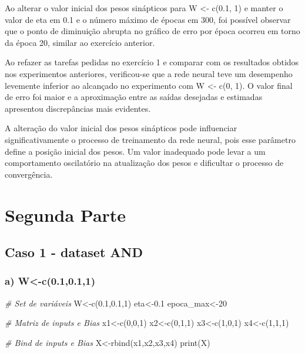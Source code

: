 \documentclass[
]{article}
\newenvironment{Shaded}{\begin{snugshade}}{\end{snugshade}}
\newcommand{\CommentTok}[1]{\textcolor[rgb]{0.56,0.35,0.01}{\textit{#1}}}
\newcommand{\DecValTok}[1]{\textcolor[rgb]{0.00,0.00,0.81}{#1}}
\newcommand{\FloatTok}[1]{\textcolor[rgb]{0.00,0.00,0.81}{#1}}
\newcommand{\FunctionTok}[1]{\textcolor[rgb]{0.00,0.00,0.00}{#1}}
\newcommand{\NormalTok}[1]{#1}
\newcommand{\OtherTok}[1]{\textcolor[rgb]{0.56,0.35,0.01}{#1}}
\begin{document}
Ao alterar o valor inicial dos pesos sinápticos para W \textless- c(0.1,
1) e manter o valor de eta em 0.1 e o número máximo de épocas em 300,
foi possível observar que o ponto de diminuição abrupta no gráfico de
erro por época ocorreu em torno da época 20, similar ao exercício
anterior.

Ao refazer as tarefas pedidas no exercício 1 e comparar com os
resultados obtidos nos experimentos anteriores, verificou-se que a rede
neural teve um desempenho levemente inferior ao alcançado no experimento
com W \textless- c(0, 1). O valor final de erro foi maior e a
aproximação entre as saídas desejadas e estimadas apresentou
discrepâncias mais evidentes.

A alteração do valor inicial dos pesos sinápticos pode influenciar
significativamente o processo de treinamento da rede neural, pois esse
parâmetro define a posição inicial dos pesos. Um valor inadequado pode
levar a um comportamento oscilatório na atualização dos pesos e
dificultar o processo de convergência.

\hypertarget{segunda-parte}{%
\section{Segunda Parte}\label{segunda-parte}}

\hypertarget{caso-1---dataset-and}{%
\subsection{Caso 1 - dataset AND}\label{caso-1---dataset-and}}

\hypertarget{a-w-c0.10.11}{%
\subsubsection{a) W\textless-c(0.1,0.1,1)}\label{a-w-c0.10.11}}

\begin{Shaded}
\begin{Highlighting}[]
\CommentTok{\# Set de variáveis}
\NormalTok{W}\OtherTok{\textless{}{-}}\FunctionTok{c}\NormalTok{(}\FloatTok{0.1}\NormalTok{,}\FloatTok{0.1}\NormalTok{,}\DecValTok{1}\NormalTok{)}
\NormalTok{eta}\OtherTok{\textless{}{-}}\FloatTok{0.1}
\NormalTok{epoca\_max}\OtherTok{\textless{}{-}}\DecValTok{20}

\CommentTok{\# Matriz de inputs e Bias}
\NormalTok{x1}\OtherTok{\textless{}{-}}\FunctionTok{c}\NormalTok{(}\DecValTok{0}\NormalTok{,}\DecValTok{0}\NormalTok{,}\DecValTok{1}\NormalTok{)}
\NormalTok{x2}\OtherTok{\textless{}{-}}\FunctionTok{c}\NormalTok{(}\DecValTok{0}\NormalTok{,}\DecValTok{1}\NormalTok{,}\DecValTok{1}\NormalTok{)}
\NormalTok{x3}\OtherTok{\textless{}{-}}\FunctionTok{c}\NormalTok{(}\DecValTok{1}\NormalTok{,}\DecValTok{0}\NormalTok{,}\DecValTok{1}\NormalTok{)}
\NormalTok{x4}\OtherTok{\textless{}{-}}\FunctionTok{c}\NormalTok{(}\DecValTok{1}\NormalTok{,}\DecValTok{1}\NormalTok{,}\DecValTok{1}\NormalTok{)}

\CommentTok{\# Bind de inputs e Bias}
\NormalTok{X}\OtherTok{\textless{}{-}}\FunctionTok{rbind}\NormalTok{(x1,x2,x3,x4)}
\FunctionTok{print}\NormalTok{(X)}
\end{Highlighting}
\end{Shaded}
\end{document}

